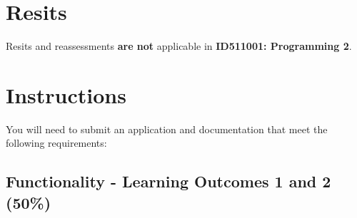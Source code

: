 \documentclass{article}
\begin{document}
\section*{Resits}
Resits and reassessments \textbf{are not} applicable in \textbf{ID511001: Programming 2}.

\section*{Instructions}
You will need to submit an application and documentation that meet the following requirements:\\

\subsection*{Functionality - Learning Outcomes 1 and 2 (50\%)}
\end{document}
